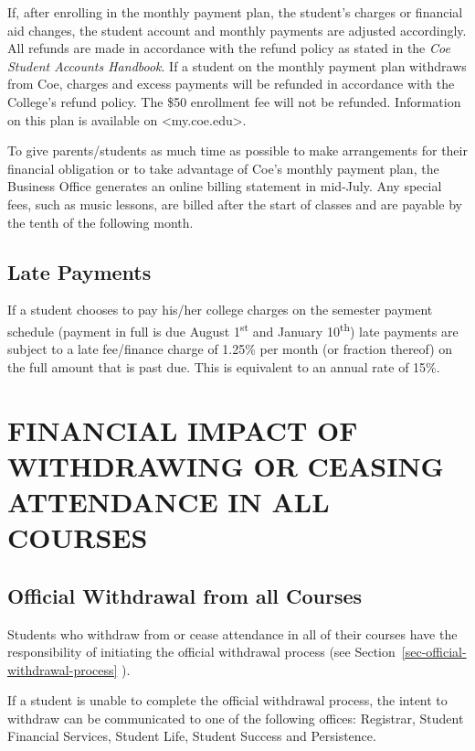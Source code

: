 \documentclass[
  letterpaper,
]{scrbook}
\begin{document}
If, after enrolling in the monthly payment plan, the student's charges
or financial aid changes, the student account and monthly payments are
adjusted accordingly. All refunds are made in accordance with the refund
policy as stated in the \emph{Coe Student Accounts Handbook}. If a
student on the monthly payment plan withdraws from Coe, charges and
excess payments will be refunded in accordance with the College's refund
policy. The \$50 enrollment fee will not be refunded. Information on
this plan is available on \textless my.coe.edu\textgreater.

To give parents/students as much time as possible to make arrangements
for their financial obligation or to take advantage of Coe's monthly
payment plan, the Business Office generates an online billing statement
in mid-July. Any special fees, such as music lessons, are billed after
the start of classes and are payable by the tenth of the following
month.

\subsection{Late Payments}\label{late-payments}

If a student chooses to pay his/her college charges on the semester
payment schedule (payment in full is due August 1\textsuperscript{st}
and January 10\textsuperscript{th}) late payments are subject to a late
fee/finance charge of 1.25\% per month (or fraction thereof) on the full
amount that is past due. This is equivalent to an annual rate of 15\%.

\section{FINANCIAL IMPACT OF WITHDRAWING OR CEASING ATTENDANCE IN ALL
COURSES}\label{financial-impact-of-withdrawing-or-ceasing-attendance-in-all-courses}

\subsection{Official Withdrawal from all
Courses}\label{official-withdrawal-from-all-courses}

Students who withdraw from or cease attendance in all of their courses
have the responsibility of initiating the official withdrawal process
(see Section~\ref{sec-official-withdrawal-process} ).

If a student is unable to complete the official withdrawal process, the
intent to withdraw can be communicated to one of the following offices:
Registrar, Student Financial Services, Student Life, Student Success and
Persistence.
\end{document}
